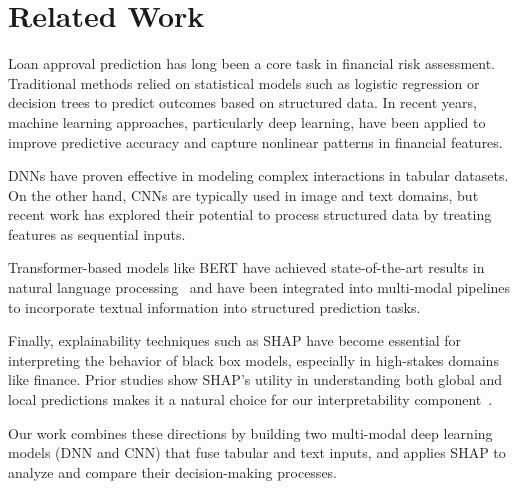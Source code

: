 \section{Related Work}

Loan approval prediction has long been a core task in financial risk assessment. Traditional methods relied on statistical models such as logistic regression or decision trees to predict outcomes based on structured data. In recent years, machine learning approaches, particularly deep learning, have been applied to improve predictive accuracy and capture nonlinear patterns in financial features.

DNNs have proven effective in modeling complex interactions in tabular datasets. On the other hand, CNNs are typically used in image and text domains, but recent work has explored their potential to process structured data by treating features as sequential inputs.

Transformer-based models like BERT have achieved state-of-the-art results in natural language processing~\cite{devlin2018bert} and have been integrated into multi-modal pipelines to incorporate textual information into structured prediction tasks.

Finally, explainability techniques such as SHAP have become essential for interpreting the behavior of black box models, especially in high-stakes domains like finance. Prior studies show SHAP’s utility in understanding both global and local predictions makes it a natural choice for our interpretability component~\cite{lundberg2017unified}.

Our work combines these directions by building two multi-modal deep learning models (DNN and CNN) that fuse tabular and text inputs, and applies SHAP to analyze and compare their decision-making processes.